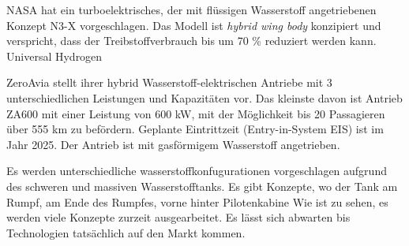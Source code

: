 NASA hat ein turboelektrisches, der mit flüssigen Wasserstoff angetriebenen Konzept N3-X \cite{NASA_N3X_2025} vorgeschlagen.
Das Modell ist \textit{hybrid wing body} konzipiert und verspricht, dass der Treibstoffverbrauch bis um 70 \% reduziert werden kann.
Universal Hydrogen

ZeroAvia stellt ihrer hybrid Wasserstoff-elektrischen Antriebe mit 3 unterschiedlichen Leistungen und Kapazitäten vor. Das kleinste davon
ist Antrieb ZA600 mit einer Leistung von 600 kW, mit der Möglichkeit bis 20 Passagieren über 555 km zu befördern. 
Geplante Eintrittzeit (Entry-in-System EIS) ist im Jahr 2025. Der Antrieb ist mit gasförmigem Wasserstoff angetrieben.




Es werden unterschiedliche wasserstoffkonfugurationen vorgeschlagen aufgrund des schweren und massiven Wasserstofftanks.
Es gibt Konzepte, wo der Tank am Rumpf, am Ende des Rumpfes, vorne hinter Pilotenkabine
Wie ist zu sehen, es werden viele Konzepte zurzeit ausgearbeitet. Es lässt sich abwarten bis Technologien tatsächlich auf den Markt kommen.
